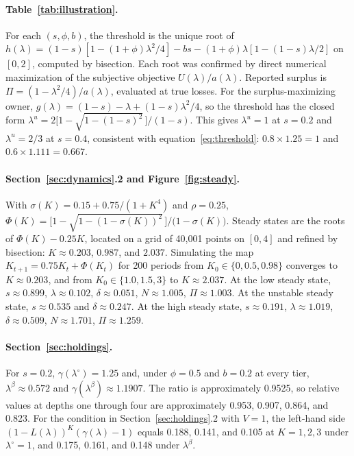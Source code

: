 \documentclass[11pt,a4paper]{article}
\theoremstyle{plain}
\begin{document}
\paragraph{Table~\ref{tab:illustration}.} For each $(s, \phi, b)$, the threshold is the unique root of $h(\lambda) = (1-s)[1 - (1+\phi)\lambda^2/4] - bs - (1+\phi)\lambda[1 - (1-s)\lambda/2]$ on $[0, 2]$, computed by bisection. Each root was confirmed by direct numerical maximization of the subjective objective $U(\lambda)/a(\lambda)$. Reported surplus is $\Pi = (1 - \lambda^2/4)/a(\lambda)$, evaluated at true losses. For the surplus-maximizing owner, $g(\lambda) = (1 - s) - \lambda + (1 - s)\lambda^2/4$, so the threshold has the closed form $\lambda^u = 2\big[1 - \sqrt{1 - (1 - s)^2}\,\big]/(1 - s)$. This gives $\lambda^u = 1$ at $s = 0.2$ and $\lambda^u = 2/3$ at $s = 0.4$, consistent with equation~\eqref{eq:threshold}: $0.8 \times 1.25 = 1$ and $0.6 \times 1.111 = 0.667$.

\paragraph{Section~\ref{sec:dynamics}.2 and Figure~\ref{fig:steady}.} With $\sigma(K) = 0.15 + 0.75/(1 + K^4)$ and $\rho = 0.25$, $\Phi(K) = \big[1 - \sqrt{1 - (1-\sigma(K))^2}\,\big]/\big(1 - \sigma(K)\big)$. Steady states are the roots of $\Phi(K) - 0.25K$, located on a grid of 40,001 points on $[0, 4]$ and refined by bisection: $K \approx 0.203$, $0.987$, and $2.037$. Simulating the map $K_{t+1} = 0.75K_t + \Phi(K_t)$ for 200 periods from $K_0 \in \{0, 0.5, 0.98\}$ converges to $K \approx 0.203$, and from $K_0 \in \{1.0, 1.5, 3\}$ to $K \approx 2.037$. At the low steady state, $s \approx 0.899$, $\lambda \approx 0.102$, $\delta \approx 0.051$, $N \approx 1.005$, $\Pi \approx 1.003$. At the unstable steady state, $s \approx 0.535$ and $\delta \approx 0.247$. At the high steady state, $s \approx 0.191$, $\lambda \approx 1.019$, $\delta \approx 0.509$, $N \approx 1.701$, $\Pi \approx 1.259$.

\paragraph{Section~\ref{sec:holdings}.} For $s = 0.2$, $\gamma(\lambda^\circ) = 1.25$ and, under $\phi = 0.5$ and $b = 0.2$ at every tier, $\lambda^\beta \approx 0.572$ and $\gamma(\lambda^\beta) \approx 1.1907$. The ratio is approximately 0.9525, so relative values at depths one through four are approximately 0.953, 0.907, 0.864, and 0.823. For the condition in Section~\ref{sec:holdings}.2 with $V = 1$, the left-hand side $(1 - L(\lambda))^K(\gamma(\lambda) - 1)$ equals 0.188, 0.141, and 0.105 at $K = 1, 2, 3$ under $\lambda^\circ = 1$, and 0.175, 0.161, and 0.148 under $\lambda^\beta$.
\end{document}
